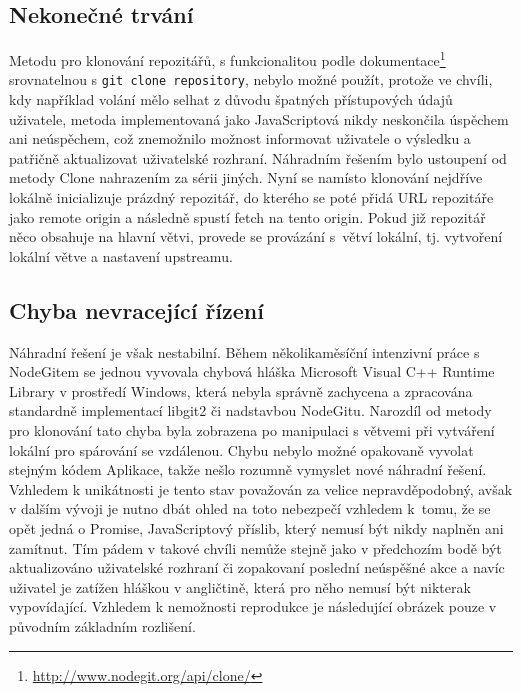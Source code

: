 \subsection{Nekonečné trvání}

Metodu pro klonování repozitářů, s funkcionalitou podle dokumentace\footnote{\url{http://www.nodegit.org/api/clone/}} srovnatelnou s \texttt{git clone repository}, nebylo možné použít, protože ve chvíli, kdy například volání mělo selhat z důvodu špatných přístupových údajů uživatele, metoda implementovaná jako JavaScriptová  nikdy neskončila úspěchem ani neúspěchem, což znemožnilo možnost informovat uživatele o výsledku a patřičně aktualizovat uživatelské rozhraní. Náhradním řešením bylo ustoupení od metody Clone nahrazením za sérii jiných. Nyní se namísto klonování nejdříve lokálně inicializuje prázdný repozitář, do kterého se poté přidá URL repozitáře jako remote origin a následně spustí fetch na tento origin. Pokud již repozitář něco obsahuje na hlavní větvi, provede se provázání s~větví lokální, tj. vytvoření lokální větve a nastavení upstreamu.

\subsection{Chyba nevracející řízení}

Náhradní řešení je však nestabilní. Během několikaměsíční intenzivní práce s NodeGitem se jednou vyvovala chybová hláška Microsoft Visual C++ Runtime Library v prostředí Windows, která nebyla správně zachycena a zpracována standardně implementací libgit2 či nadstavbou NodeGitu. Narozdíl od metody pro klonování tato chyba byla zobrazena po manipulaci s větvemi při vytváření lokální pro spárování se vzdálenou. Chybu nebylo možné opakovaně vyvolat stejným kódem Aplikace, takže nešlo rozumně vymyslet nové náhradní řešení. Vzhledem k unikátnosti je tento stav považován za velice nepravděpodobný, avšak v dalším vývoji je nutno dbát ohled na toto nebezpečí vzhledem k~tomu, že se opět jedná o Promise, JavaScriptový příslib, který nemusí být nikdy naplněn ani zamítnut. Tím pádem v takové chvíli nemůže stejně jako v předchozím bodě být aktualizováno uživatelské rozhraní či zopakovaní poslední neúspěšné akce a navíc uživatel je zatížen hláškou v angličtině, která pro něho nemusí být nikterak vypovídající. Vzhledem k nemožnosti reprodukce je následující obrázek pouze v původním základním rozlišení.

